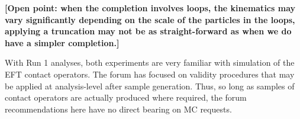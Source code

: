 \documentclass[a4,debug,notitlepage,nobib]{tufte-handout}
\begin{document}
\textbf{[Open point: when the completion involves loops, 
the kinematics may vary significantly depending on the scale of the particles in 
the loops, applying a truncation may not be as straight-forward as when we do have a simpler completion.]}

With Run 1 analyses, both experiments are very familiar with
simulation of the EFT contact operators. The forum has focused on
validity procedures that may be applied at analysis-level after sample
generation. Thus, so long as samples of contact operators are actually
produced where required, the forum recommendations here have no direct
bearing on MC requests.





\end{document}
